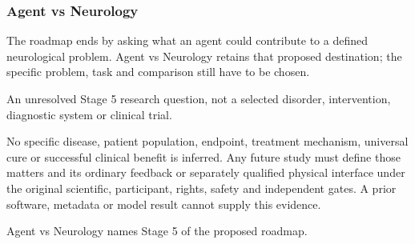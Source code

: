 
\subsubsection*{Agent vs Neurology}

\noindent The roadmap ends by asking what an agent could contribute to a defined neurological problem. Agent vs Neurology retains that proposed destination; the specific problem, task and comparison still have to be chosen.\par

\noindent An unresolved Stage 5 research question, not a selected disorder, intervention, diagnostic system or clinical trial.\par

\noindent No specific disease, patient population, endpoint, treatment mechanism, universal cure or successful clinical benefit is inferred. Any future study must define those matters and its ordinary feedback or separately qualified physical interface under the original scientific, participant, rights, safety and independent gates. A prior software, metadata or model result cannot supply this evidence.\par

\noindent Agent vs Neurology names Stage 5 of the proposed roadmap.\par
